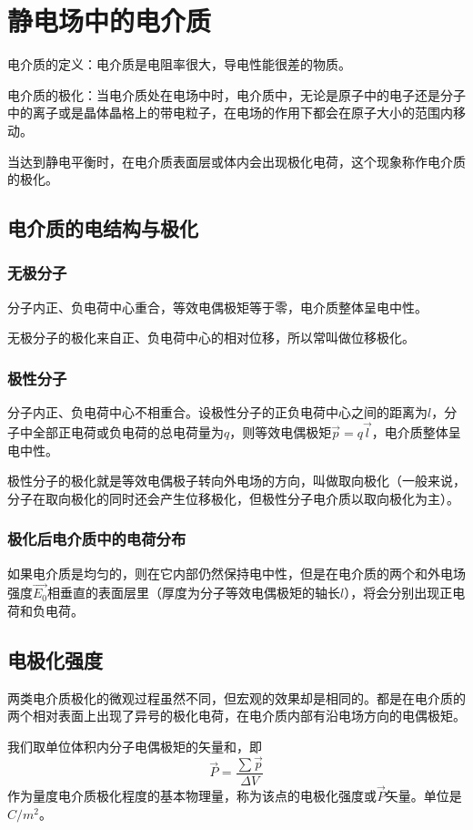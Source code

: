 \section{静电场中的电介质}
电介质的定义：电介质是电阻率很大，导电性能很差的物质。

电介质的极化：当电介质处在电场中时，电介质中，无论是原子中的电子还是分子中的离子或是晶体晶格上的带电粒子，在电场的作用下都会在原子大小的范围内移动。

当达到静电平衡时，在电介质表面层或体内会出现极化电荷，这个现象称作电介质的极化。

\subsection{电介质的电结构与极化}
\subsubsection{无极分子}
分子内正、负电荷中心重合，等效电偶极矩等于零，电介质整体呈电中性。

无极分子的极化来自正、负电荷中心的相对位移，所以常叫做位移极化。

\subsubsection{极性分子}
分子内正、负电荷中心不相重合。设极性分子的正负电荷中心之间的距离为$l$，分子中全部正电荷或负电荷的总电荷量为$q$，则等效电偶极矩$\vec{p}=q\vec{l}$，电介质整体呈电中性。

极性分子的极化就是等效电偶极子转向外电场的方向，叫做取向极化（一般来说，分子在取向极化的同时还会产生位移极化，但极性分子电介质以取向极化为主）。

\subsubsection{极化后电介质中的电荷分布}
如果电介质是均匀的，则在它内部仍然保持电中性，但是在电介质的两个和外电场强度$\vec{E_0}$相垂直的表面层里（厚度为分子等效电偶极矩的轴长$l$），将会分别出现正电荷和负电荷。

\subsection{电极化强度}
两类电介质极化的微观过程虽然不同，但宏观的效果却是相同的。都是在电介质的两个相对表面上出现了异号的极化电荷，在电介质内部有沿电场方向的电偶极矩。

我们取单位体积内分子电偶极矩的矢量和，即
$$\vec{P}=\frac{\sum \vec{p}}{\Delta V}$$
作为量度电介质极化程度的基本物理量，称为该点的电极化强度或$\vec{P}$矢量。单位是$C/m^2$。

